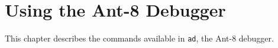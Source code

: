 %

\chapter{Using the {\sc Ant-8} Debugger}

This chapter describes the commands available in {\tt ad},
the {\sc Ant-8} debugger.


